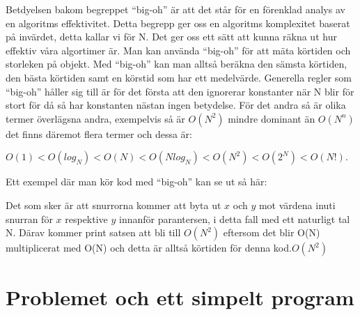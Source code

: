 \documentclass[a4paper,12pt]{article}
\begin{document}
Betdyelsen bakom begreppet “big-oh” är att det står för en förenklad 
analys av en algoritms effektivitet.
Detta begrepp ger oss en algoritms komplexitet baserat på invärdet, 
detta kallar vi för N. Det ger oss ett sätt att kunna räkna ut hur effektiv
våra algortimer är. Man kan använda “big-oh” för att mäta körtiden och 
storleken på objekt. Med “big-oh” kan man alltså beräkna den sämsta 
körtiden, den bästa körtiden samt en körstid som har ett medelvärde. 
Generella regler som “big-oh” håller sig till är för det första att den 
ignorerar konstanter när N blir för stort för då så har konstanten 
nästan ingen betydelse. För det andra så är olika termer överlägsna andra, 
exempelvis så är $O(N^2)$ mindre dominant än $O(N^n)$ det finns
däremot flera termer och dessa är:
%
\begin{center}
$O(1) < O(log_N) < O(N) < O(Nlog_N) < O(N^2) < O(2^N) < O(N!).$
\end{center}
%
Ett exempel där man kör kod med “big-oh” kan se ut så här:
%
\begin{center}
\begin{algorithmic}
 	 \ENDFOR
 \ENDFOR
\end{algorithmic}
\end{center}
%
Det som sker är att snurrorna kommer att byta ut $x$ och $y$ mot värdena 
inuti snurran för $x$ respektive $y$ innanför parantersen, i detta fall med 
ett naturligt tal N. Därav kommer print satsen att bli till $O(N^2)$ eftersom
det blir O(N) multiplicerat med O(N) och detta är alltså körtiden för denna
kod.$O(N^2)$
%


\section{Problemet och ett simpelt program}
\label{sec:uppg1}
\end{document}
